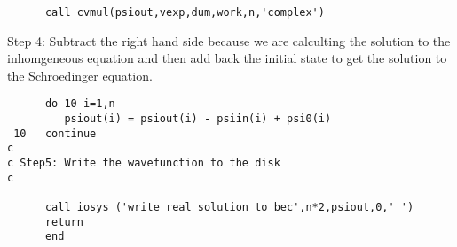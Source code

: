 \documentclass{article}
\begin{document}
\begin{verbatim}
      call cvmul(psiout,vexp,dum,work,n,'complex')
\end{verbatim}
 Step 4: Subtract the right hand side because we are calculting the solution
         to the inhomgeneous equation and then add back the initial
         state to get the solution to the Schroedinger equation.
\begin{verbatim}
      do 10 i=1,n
         psiout(i) = psiout(i) - psiin(i) + psi0(i)
 10   continue   
c
c Step5: Write the wavefunction to the disk
c

      call iosys ('write real solution to bec',n*2,psiout,0,' ')
      return
      end
\end{verbatim}
\end{document}
